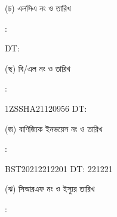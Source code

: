 \documentclass[12pt]{article}
\newcommand{\blno}{1ZSSHA21120956}
\newcommand{\bldt}{}
\newcommand{\lcano}{}
\newcommand{\lcadt}{}
\newcommand{\invno}{BST20212212201}
\newcommand{\invdt}{221221}
\begin{document}
\begin{minipage}[t]{0.05\linewidth}
\hspace*{1em}
\end{minipage}
\begin{minipage}[t]{0.40\linewidth}
(চ) এলসিএ নং ও তারিখ
\end{minipage}
\begin{minipage}[t]{0.02\linewidth}
:
\end{minipage}
\begin{minipage}[t]{0.53\linewidth}
{\lcano} \hspace{2em} DT: {\lcadt}
\\
\end{minipage}
\begin{minipage}[t]{0.05\linewidth}
\hspace*{1em}
\end{minipage}
\begin{minipage}[t]{0.40\linewidth}
(ছ) বি/এল নং ও তারিখ
\end{minipage}
\begin{minipage}[t]{0.02\linewidth}
:
\end{minipage}
\begin{minipage}[t]{0.53\linewidth}
{\blno} \hspace{2em} DT: {\bldt}
\\
\end{minipage}
\begin{minipage}[t]{0.05\linewidth}
\hspace*{1em}
\end{minipage}
\begin{minipage}[t]{0.40\linewidth}
(জ) বাণিজ্যিক ইনভয়েস নং ও তারিখ
\end{minipage}
\begin{minipage}[t]{0.02\linewidth}
:
\end{minipage}
\begin{minipage}[t]{0.53\linewidth}
{\invno} \hspace{2em} DT: {\invdt}
\\
\end{minipage}
\begin{minipage}[t]{0.05\linewidth}
\hspace*{1em}
\end{minipage}
\begin{minipage}[t]{0.40\linewidth}
(ঝ) সিআরএফ নং ও ইস্যুর তারিখ
\end{minipage}
\begin{minipage}[t]{0.02\linewidth}
:
\end{minipage}
\end{document}
